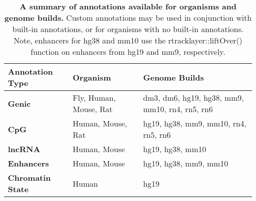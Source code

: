 \begin{table}[!ht]
\centering
\small
\begin{tabular}{l|ll}
\textbf{Annotation Type} & \textbf{Organism}      & \textbf{Genome Builds}                         \\\hline
\textbf{Genic}           & Fly, Human, Mouse, Rat & dm3, dm6, hg19, hg38, mm9, mm10, rn4, rn5, rn6 \\
\textbf{CpG}             & Human, Mouse, Rat      & hg19, hg38, mm9, mm10, rn4, rn5, rn6           \\
\textbf{lncRNA}          & Human, Mouse           & hg19, hg38, mm10                               \\
\textbf{Enhancers}       & Human, Mouse           & hg19, hg38, mm9, mm10                          \\
\textbf{Chromatin State} & Human                  & hg19
\end{tabular}
\normalsize
\caption[A summary of annotations available for organisms and genome builds.]
{
\textbf{A summary of annotations available for organisms and genome builds.}
Custom annotations may be used in conjunction with built-in annotations, or for organisms with no built-in annotations. Note, enhancers for hg38 and mm10 use the rtracklayer::liftOver() function on enhancers from hg19 and mm9, respectively.
}
\label{chap4:table:1}

\end{table}

\newpage

